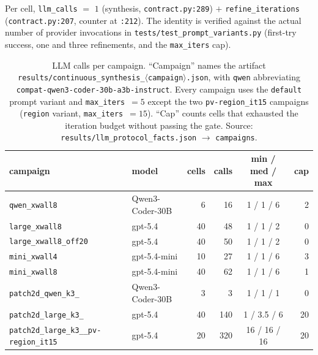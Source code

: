 Per cell, \texttt{llm\_calls} $=$ $1$ (synthesis, \texttt{contract.py:289}) $+$
\texttt{refine\_\allowbreak iterations} (\texttt{contract.py:207}, counter at \texttt{:212}).
The identity is verified against the actual number of provider invocations in
\texttt{tests/\allowbreak test\_\allowbreak prompt\_\allowbreak variants.\allowbreak py} (first-try success, one and three
refinements, and the \texttt{max\_iters} cap).

\begin{table}[htbp]
\centering
\footnotesize
\caption{LLM calls per campaign. ``Campaign'' names the artifact
\texttt{results/\allowbreak continuous\_\allowbreak synthesis\_\allowbreak $\langle$campaign$\rangle$.\allowbreak json}, with
\texttt{qwen} abbreviating \texttt{compat-qwen3-coder-30b-a3b-instruct}.
Every campaign uses the \texttt{default} prompt variant and
\texttt{max\_iters}~$=5$ except the two \texttt{pv-region\_it15} campaigns
(\texttt{region} variant, \texttt{max\_iters}~$=15$). ``Cap'' counts cells that
exhausted the iteration budget without passing the gate. Source:
\texttt{results/\allowbreak llm\_\allowbreak protocol\_\allowbreak facts.\allowbreak json} $\rightarrow$ \texttt{campaigns}.}
\label{tab:proto-calls}
\begin{tabular}{llrrcr}
\toprule
campaign & model & cells & calls & min / med / max & cap \\
\midrule
\texttt{qwen\_xwall8}                     & Qwen3-Coder-30B & 6  & 16  & 1 / 1 / 6    & 2  \\
\texttt{large\_xwall8}                    & gpt-5.4         & 40 & 48  & 1 / 1 / 2    & 0  \\
\texttt{large\_\allowbreak xwall8\_\allowbreak off20}             & gpt-5.4         & 40 & 50  & 1 / 1 / 2    & 0  \\
\texttt{mini\_xwall4}                     & gpt-5.4-mini    & 10 & 27  & 1 / 1 / 6    & 3  \\
\texttt{mini\_xwall8}                     & gpt-5.4-mini    & 40 & 62  & 1 / 1 / 6    & 1  \\
\texttt{patch2d\_\allowbreak qwen\_\allowbreak k3\_\allowbreak 7}             & Qwen3-Coder-30B & 3  & 3   & 1 / 1 / 1    & 0  \\
\texttt{patch2d\_\allowbreak large\_\allowbreak k3\_\allowbreak 7}            & gpt-5.4         & 40 & 140 & 1 / 3.5 / 6  & 20 \\
\texttt{patch2d\_\allowbreak large\_\allowbreak k3\_\allowbreak 7\_\allowbreak pv-region\_\allowbreak it15} & gpt-5.4   & 20 & 320 & 16 / 16 / 16 & 20 \\

\end{tabular}
\end{table}
